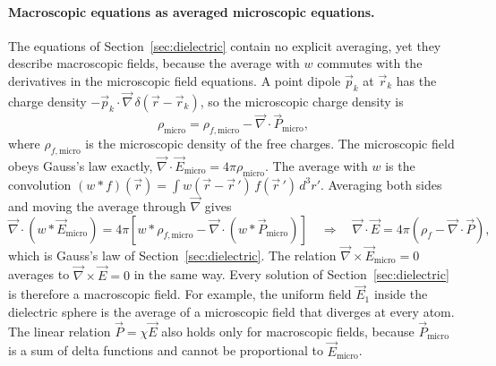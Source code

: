 \paragraph{Macroscopic equations as averaged microscopic equations.}
The equations of Section~\ref{sec:dielectric} contain no explicit averaging, yet they describe macroscopic fields, because the average with $w$ commutes with the derivatives in the microscopic field equations. A point dipole $\vec p_k$ at $\vec r_k$ has the charge density $-\vec p_k\cdot\vec\nabla\,\delta(\vec r - \vec r_k)$, so the microscopic charge density is
\begin{equation*}
    \rho_{\text{micro}} = \rho_{f,\text{micro}} - \vec\nabla\cdot\vec P_{\text{micro}},
\end{equation*}
where $\rho_{f,\text{micro}}$ is the microscopic density of the free charges. The microscopic field obeys Gauss's law exactly, $\vec\nabla\cdot\vec E_{\text{micro}} = 4\pi\rho_{\text{micro}}$. The average with $w$ is the convolution $(w * f)(\vec r) = \int w(\vec r - \vec r\,')\,f(\vec r\,')\,d^3r'$. Averaging both sides and moving the average through $\vec\nabla$ gives
\begin{equation*}
    \vec\nabla\cdot\left(w * \vec E_{\text{micro}}\right) = 4\pi\left[w * \rho_{f,\text{micro}} - \vec\nabla\cdot\left(w * \vec P_{\text{micro}}\right)\right]
    \quad\Rightarrow\quad
    \vec\nabla\cdot\vec E = 4\pi\left(\rho_f - \vec\nabla\cdot\vec P\right),
\end{equation*}
which is Gauss's law of Section~\ref{sec:dielectric}. The relation $\vec\nabla\times\vec E_{\text{micro}} = 0$ averages to $\vec\nabla\times\vec E = 0$ in the same way. Every solution of Section~\ref{sec:dielectric} is therefore a macroscopic field. For example, the uniform field $\vec E_1$ inside the dielectric sphere is the average of a microscopic field that diverges at every atom. The linear relation $\vec P = \chi\vec E$ also holds only for macroscopic fields, because $\vec P_{\text{micro}}$ is a sum of delta functions and cannot be proportional to $\vec E_{\text{micro}}$.

